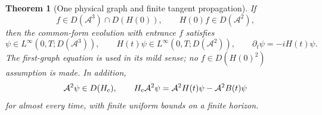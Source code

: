 \documentclass[11pt]{article}
\numberwithin{equation}{section}
\newtheorem{theorem}{Theorem}[section]
\theoremstyle{definition}
\theoremstyle{remark}
\begin{document}
\begin{theorem}[One physical graph and finite tangent propagation]
\label{p3d:thm:graph}
If
\begin{equation}\label{p3d:eq:entrance}
 f\in D(\mathcal A^3)\cap D(H(0)),\qquad
 H(0)f\in D(\mathcal A^2),
\end{equation}
then the common-form evolution with entrance $f$ satisfies
\begin{equation}\label{p3d:eq:graphs}
 \psi\in L^\infty(0,T;D(\mathcal A^3)),\qquad
 H(t)\psi\in L^\infty(0,T;D(\mathcal A^2)),\qquad
 \partial_t\psi=-iH(t)\psi.
\end{equation}
The first-graph equation is used in its mild sense; no
$f\in D(H(0)^2)$ assumption is made. In addition,
\begin{equation}\label{p3d:eq:closedcentral}
 \mathcal A^2\psi\in D(H_{\rm c}),\qquad
 H_{\rm c}\mathcal A^2\psi
 =\mathcal A^2H(t)\psi-\mathcal A^2B(t)\psi
\end{equation}
for almost every time, with finite uniform bounds on a finite horizon.
\end{theorem}
\end{document}
